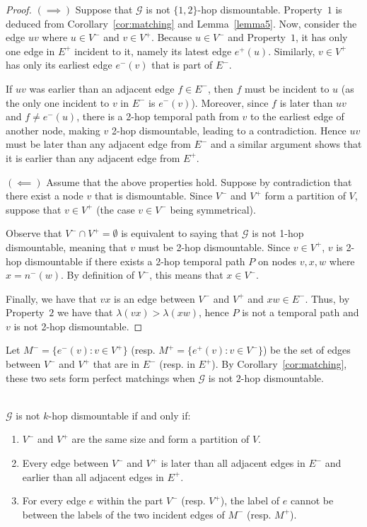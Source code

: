 \documentclass[USenglish, a4paper, thm-restate,numberwithinsect, cleveref]{lipics-v2021}
\newcommand{\G}{\ensuremath{\mathcal{G}}\xspace}
\begin{document}
\begin{proof}
  $(\implies)$ Suppose that $\G$ is not $\{1,2\}$-hop dismountable. Property~$1$ is deduced from Corollary~\ref{cor:matching} and Lemma~\ref{lemma5}.
  Now, consider the edge $uv$ where $u\in V^-$ and $v\in V^+$. Because $u \in V^-$ and Property~$1$, it has only one edge in $E^+$ incident to it, namely its latest edge $e^+(u)$. Similarly,
  $v \in V^+$ has only its earliest edge $e^-(v)$ that is part of $E^-$.

  If $uv$ was earlier than an adjacent edge $f \in E^-$, then $f$ must be incident to $u$ (as the only one incident to $v$ in $E^-$ is $e^-(v)$).
  Moreover, since $f$ is later than $uv$ and $f \neq e^-(u)$, there is a 2-hop temporal path from $v$ to the earliest edge of another node, making $v$ 2-hop dismountable, leading to a contradiction.
  Hence $uv$ must be later than any adjacent edge from $E^-$ and a similar argument shows that it is earlier than any adjacent edge from $E^+$.

  $(\impliedby)$  Assume that the above properties hold. Suppose by contradiction that there exist a node $v$ that is dismountable.
  Since $V^-$ and $V^+$ form a partition of $V$, suppose that $v \in V^+$ (the case $v \in V^-$ being symmetrical).

  Observe that $V^-\cap V^+=\emptyset$ is equivalent to saying that $\G$ is not 1-hop dismountable, meaning that $v$ must be 2-hop dismountable.
  Since $v\in V^+$, $v$ is 2-hop dismountable if there exists a 2-hop temporal path $P$ on nodes $v,x,w$ where $x=n^-(w)$. By definition of $V^-$, this means that $x\in V^-$.

  Finally, we have that $vx$ is an edge between $V^-$ and $V^+$ and $xw\in E^-$.
  Thus, by Property~$2$ we have that $\lambda(vx)>\lambda(xw)$, hence $P$ is not a temporal path and $v$ is not 2-hop dismountable.
\end{proof}

Let $M^-=\{e^-(v) : v\in V^+\}$ (resp. $M^+=\{e^+(v) : v\in V^-\}$) be the set of edges between $V^-$ and $V^+$ that are in $E^-$ (resp. in $E^+$). By Corollary~\ref{cor:matching}, these two sets form perfect matchings when $\G$ is not $2$-hop dismountable.

\begin{theorem}\label{lemma:non-1,2,3-hop}~\\
  $\G$ is not $k$-hop dismountable if and only if:
  \begin{enumerate}
      \item $V^-$ and $V^+$ are the same size and form a partition of $V$.
      \item Every edge between $V^-$ and $V^+$ is later than all adjacent edges in $E^-$ and earlier than all adjacent edges in $E^+$.
      \item For every edge $e$ within the part $V^-$ (resp. $V^+$), the label of $e$ cannot be between the labels of the two incident edges of $M^-$ (resp. $M^+$).
  \end{enumerate}
\end{theorem}
\end{document}
